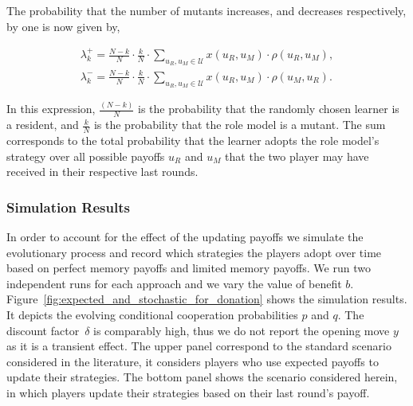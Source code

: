 \documentclass[11pt]{article}
\theoremstyle{plainCl1}
\theoremstyle{plainCl2}
\begin{document}
The probability that the number of mutants increases, and decreases respectively,
by one is now given by,

\begin{align}
\lambda^+_k=\frac{N\!-\!k}{N}\cdot \frac{k}{N}\cdot \sum_{u_{R},u_{M}\in\mathcal{U}} x(u_{R},u_{M})\cdot \rho(u_{R},u_{M}), \\
\lambda^-_k=\frac{N\!-\!k}{N}\cdot \frac{k}{N}\cdot \sum_{u_{R},u_{M}\in\mathcal{U}} x(u_{R},u_{M})\cdot \rho(u_{M},u_{R}).
\end{align}

In this expression, $\frac{(N\!-\!k)}{N}$ is the probability that the randomly
chosen learner is a resident, and $\frac{k}{N}$ is the probability that the role
model is a mutant. The sum corresponds to the total probability that the learner
adopts the role model's strategy over all possible payoffs $u_R$ and $u_M$ that
the two player may have received in their respective last rounds.


\subsubsection*{Simulation Results}

In order to account for the effect of the updating payoffs we simulate the
evolutionary process and record which strategies the players adopt over time
based on perfect memory payoffs and limited memory payoffs. We run two
independent runs for each approach and we vary the value of benefit \(b\).
Figure~\ref{fig:expected_and_stochastic_for_donation} shows the simulation
results. It depicts the evolving conditional cooperation probabilities $p$ and
$q$. The discount factor~$\delta$ is comparably high, thus we do not report the
opening move \(y\) as it is a transient effect. The upper panel correspond to
the standard scenario considered in the literature, it considers players who use
expected payoffs to update their strategies. The bottom panel shows the scenario
considered herein, in which players update their strategies based on their last
round's payoff.
\end{document}
